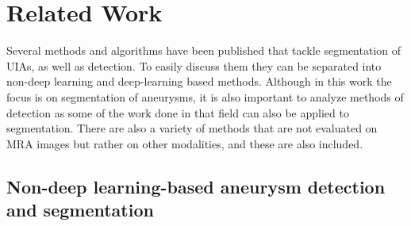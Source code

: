 \chapter{Related Work}
\label{chapter2}

Several methods and algorithms have been published that tackle segmentation of UIAs, as well as detection. To easily discuss them they can be separated into non-deep learning and deep-learning based methods. Although in this work the focus is on segmentation of aneurysms, it is also important to analyze methods of detection as some of the work done in that field can also be applied to segmentation. There are also a variety of methods that are not evaluated on MRA images but rather on other modalities, and these are also included.

\section{Non-deep learning-based aneurysm detection and segmentation}
